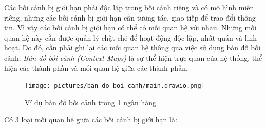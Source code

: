






Các bối cảnh bị giới hạn phải độc lập trong bối cảnh riêng và có mô hình miền riêng, nhưng các bối cảnh bị giới hạn cần tương tác, giao tiếp để trao đổi thông tin. Vì vậy các bối cảnh bị giới hạn có thể có mối quan hệ với nhau. Những mối quan hệ này cần được quản lý chặt chẽ để hoạt động độc lập, nhất quán và linh hoạt. Do đó, cần phải ghi lại các mối quan hệ thông qua việc sử dụng bản đồ bối cảnh. \emph{Bản đồ bối cảnh (Context Maps)} là sự thể hiện trực quan của hệ thống, thể hiện các thành phần và mối quan hệ giữa các thành phần.

\begin{figure}[H]

\centering

\texttt{[image: pictures/ban\_do\_boi\_canh/main.drawio.png]}

\caption{Ví dụ bản đồ bối cảnh trong 1 ngân hàng}

\end{figure}












Có 3 loại mối quan hệ giữa các bối cảnh bị giới hạn là:

